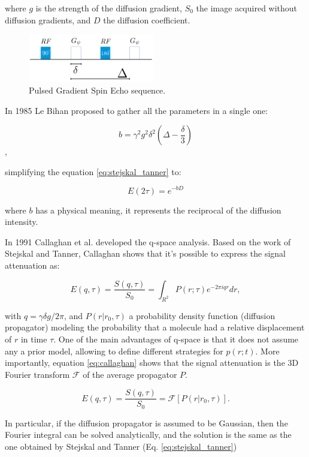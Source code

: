 where $g$ is the strength of the diffusion gradient, $S_0$ the
image acquired without diffusion gradients, and $D$ the diffusion coefficient.

\begin{figure}
    \includegraphics[width=0.49\textwidth]{3.mri/img/fgp.png}
    \caption{Pulsed Gradient Spin Echo sequence.}
    \label{fig:fgp}
\end{figure}  

In 1985 Le Bihan \cite{LEBIHAN} proposed to gather all the parameters in a
single one: 

$$ b = \gamma^2 g^2 \delta^2 \left(\Delta - \frac{\delta}{3}\right) $$,

simplifying the equation \ref{eq:stejskal_tanner} to:

$$ E(2\tau) = e^{-b D} $$

where $b$ has a physical meaning, it represents the reciprocal of the diffusion
intensity\cite{LEBIHAN}.

In 1991 Callaghan et al. \cite{Callaghan1991} developed the q-space analysis.
Based on the work of Stejskal and Tanner, Callaghan shows that it's possible
to express the signal attenuation as:

\begin{equation}
\label{eq:callaghan}
E(q,\tau) =  \frac{S(q,\tau)}{S_0} = \int_{R^2}{P(r;\tau)e^{-2\pi i q r} dr},
\end{equation}

with $q =  \gamma \delta g / 2\pi$, and $P(r|r_0, \tau)$ a probability density
function (diffusion propagator) modeling the probability that a molecule had a
relative displacement of $r$ in time $\tau$. One of the main advantages of
q-space is that it does not assume any a prior model, allowing to define 
different strategies for $p(r;t)$. More importantly, equation
\ref{eq:callaghan} shows that the signal attenuation is the 3D Fourier
transform $\mathcal{F}$ of the average propagator $P$. 

\begin{equation}
    \label{eq:fourier_callaghan}
    E(q, \tau) = \frac{S(q, \tau)}{S_0} =
    \mathcal{F}[P(r|r_0, \tau)].
\end{equation}

In particular, if the diffusion propagator is assumed to be Gaussian, then the
Fourier integral can be solved analytically, and the solution is the same
as the one obtained by Stejskal and Tanner (Eq. \ref{eq:stejskal_tanner})

